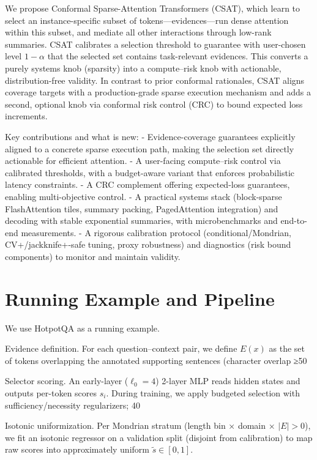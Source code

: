 \documentclass[11pt]{article}
\begin{document}
We propose Conformal Sparse-Attention Transformers (CSAT), which learn to select an instance-specific subset of tokens—evidences—run dense attention within this subset, and mediate all other interactions through low-rank summaries. CSAT calibrates a selection threshold to guarantee with user-chosen level $1-\alpha$ that the selected set contains task-relevant evidences. This converts a purely systems knob (sparsity) into a compute–risk knob with actionable, distribution-free validity. In contrast to prior conformal rationales, CSAT aligns coverage targets with a production-grade sparse execution mechanism and adds a second, optional knob via conformal risk control (CRC) to bound expected loss increments.

Key contributions and what is new:
- Evidence-coverage guarantees explicitly aligned to a concrete sparse execution path, making the selection set directly actionable for efficient attention.
- A user-facing compute–risk control via calibrated thresholds, with a budget-aware variant that enforces probabilistic latency constraints.
- A CRC complement offering expected-loss guarantees, enabling multi-objective control.
- A practical systems stack (block-sparse FlashAttention tiles, summary packing, PagedAttention integration) and decoding with stable exponential summaries, with microbenchmarks and end-to-end measurements.
- A rigorous calibration protocol (conditional/Mondrian, CV+/jackknife+-safe tuning, proxy robustness) and diagnostics (risk bound components) to monitor and maintain validity.

\section{Running Example and Pipeline}
We use HotpotQA as a running example.

Evidence definition. For each question–context pair, we define $E(x)$ as the set of tokens overlapping the annotated supporting sentences (character overlap ≥50%

Selector scoring. An early-layer ($\ell_0=4$) 2-layer MLP reads hidden states and outputs per-token scores $s_i$. During training, we apply budgeted selection with sufficiency/necessity regularizers; 40%

Isotonic uniformization. Per Mondrian stratum (length bin × domain × $|E|>0$), we fit an isotonic regressor on a validation split (disjoint from calibration) to map raw scores into approximately uniform $\tilde{s}\in[0,1]$.
\end{document}
